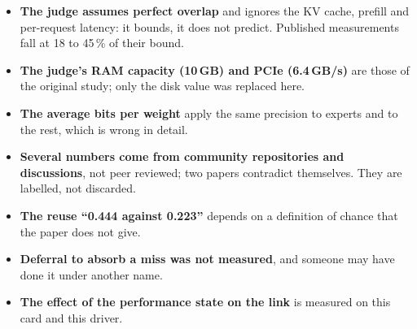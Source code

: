 \begin{faux}
\begin{itemize}
\item \textbf{The judge assumes perfect overlap} and ignores the KV cache, prefill and per-request latency: it bounds, it does not predict. Published measurements fall at 18 to 45\,\% of their bound.
\item \textbf{The judge's RAM capacity (10\,GB) and PCIe (6.4\,GB/s)} are those of the original study; only the disk value was replaced here.
\item \textbf{The average bits per weight} apply the same precision to experts and to the rest, which is wrong in detail.
\item \textbf{Several numbers come from community repositories and discussions}, not peer reviewed; two papers contradict themselves. They are labelled, not discarded.
\item \textbf{The reuse \enquote{0.444 against 0.223}} depends on a definition of chance that the paper does not give.
\item \textbf{Deferral to absorb a miss was not measured}, and someone may have done it under another name.
\item \textbf{The effect of the performance state on the link} is measured on this card and this driver.
\end{itemize}
\end{faux}
